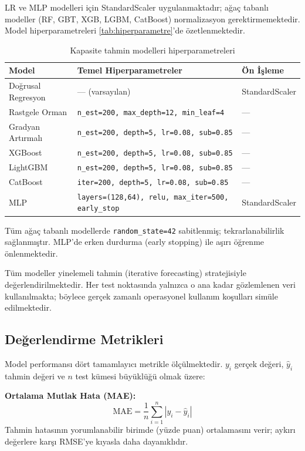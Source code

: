 LR ve MLP modelleri için StandardScaler uygulanmaktadır; ağaç tabanlı modeller (RF, GBT, XGB, LGBM, CatBoost) normalizasyon gerektirmemektedir.
Model hiperparametreleri \autoref{tab:hiperparametre}'de özetlenmektedir.

\begin{table}[htbp]
    \centering
    \caption{Kapasite tahmin modelleri hiperparametreleri}
    \label{tab:hiperparametre}
    \begin{tabular}{lll}
        \textbf{Model} & \textbf{Temel Hiperparametreler} & \textbf{Ön İşleme} \\
        \hline
        Doğrusal Regresyon & — (varsayılan) & StandardScaler \\
        Rastgele Orman     & \texttt{n\_est=200, max\_depth=12, min\_leaf=4} & — \\
        Gradyan Artırmalı  & \texttt{n\_est=200, depth=5, lr=0.08, sub=0.85} & — \\
        XGBoost            & \texttt{n\_est=200, depth=5, lr=0.08, sub=0.85} & — \\
        LightGBM           & \texttt{n\_est=200, depth=5, lr=0.08, sub=0.85} & — \\
        CatBoost           & \texttt{iter=200, depth=5, lr=0.08, sub=0.85}   & — \\
        MLP                & \texttt{layers=(128,64), relu, max\_iter=500, early\_stop} & StandardScaler \\
    \end{tabular}
\end{table}

Tüm ağaç tabanlı modellerde \texttt{random\_state=42} sabitlenmiş; tekrarlanabilirlik sağlanmıştır.
MLP'de erken durdurma (early stopping) ile aşırı öğrenme önlenmektedir.

Tüm modeller yinelemeli tahmin (iterative forecasting) stratejisiyle değerlendirilmektedir.
Her test noktasında yalnızca o ana kadar gözlemlenen veri kullanılmakta; böylece gerçek zamanlı operasyonel kullanım koşulları simüle edilmektedir.

\subsection{Değerlendirme Metrikleri}

Model performansı dört tamamlayıcı metrikle ölçülmektedir.
$y_i$ gerçek değeri, $\hat{y}_i$ tahmin değeri ve $n$ test kümesi büyüklüğü olmak üzere:

\textbf{Ortalama Mutlak Hata (MAE):}
\begin{equation}
    \text{MAE} = \frac{1}{n} \sum_{i=1}^{n} |y_i - \hat{y}_i|
    \label{eq:mae}
\end{equation}
Tahmin hatasının yorumlanabilir birimde (yüzde puan) ortalamasını verir; aykırı değerlere karşı RMSE'ye kıyasla daha dayanıklıdır.

